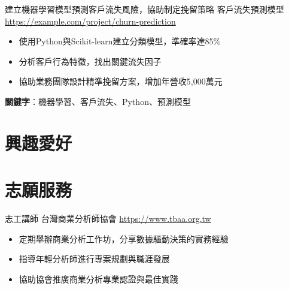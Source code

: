 \documentclass[a4paper, serif, 10pt]{moderncv}
\begin{document}
        {建立機器學習模型預測客戶流失風險，協助制定挽留策略}
        {客戶流失預測模型}
        {\url{https://example.com/project/churn-prediction}}
        {}
        {\begin{itemize}
\item 使用Python與Scikit-learn建立分類模型，準確率達85\%
\item 分析客戶行為特徵，找出關鍵流失因子
\item 協助業務團隊設計精準挽留方案，增加年營收5,000萬元
\end{itemize}
\textbf{關鍵字}：機器學習、客戶流失、Python、預測模型}
\section{興趣愛好}

\section{志願服務}

        {志工講師}
        {台灣商業分析師協會}
        {\url{https://www.tbaa.org.tw}}
        {}
        {\begin{itemize}
\item 定期舉辦商業分析工作坊，分享數據驅動決策的實務經驗
\item 指導年輕分析師進行專案規劃與職涯發展
\item 協助協會推廣商業分析專業認證與最佳實踐
\end{itemize}}
    
\end{document}

